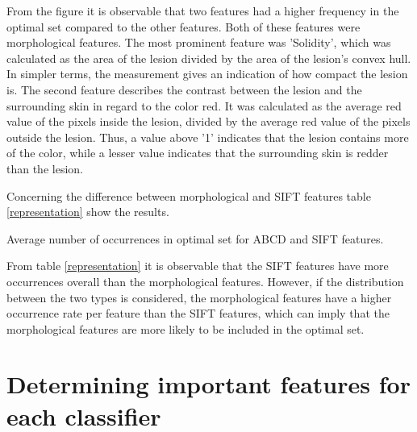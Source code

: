\documentclass{kththesis}
\begin{document}
\newpage

From the figure it is observable that two features had a higher frequency in the optimal set compared to the other features. Both of these features were morphological features. The most prominent feature was 'Solidity', which was calculated as the area of the lesion divided by the area of the lesion's convex hull. In simpler terms, the measurement gives an indication of how compact the lesion is. The second feature describes the contrast between the lesion and the surrounding skin in regard to the color red. It was calculated as the average red value of the pixels inside the lesion, divided by the average red value of the pixels outside the lesion. Thus, a value above '1' indicates that the lesion contains more of the color, while a lesser value indicates that the surrounding skin is redder than the lesion.

Concerning the difference between morphological and SIFT features table \ref{representation} show the results. 

\begin{table}[h!]
  \caption{Average number of occurrences in optimal set for ABCD and SIFT features.}
  \label{representation}
\end{table}

From table \ref{representation} it is observable that the SIFT features have more occurrences overall than the morphological features. However, if the distribution between the two types is considered, the morphological features have a higher occurrence rate per feature than the SIFT features, which can imply that the morphological features are more likely to be included in the optimal set.

\section{Determining important features for each classifier}
\end{document}
